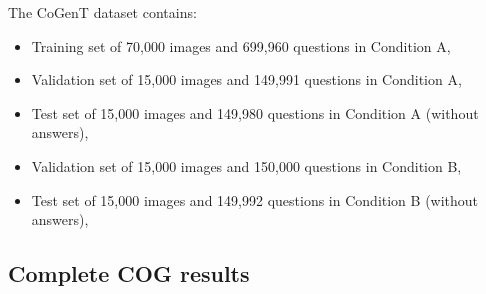 The CoGenT dataset contains:
\begin{itemize}
	\item Training set of 70,000 images and 699,960 questions in Condition A,
	\item	Validation set of 15,000 images and 149,991 questions in Condition A,
	\item	Test set of 15,000 images and 149,980 questions in Condition A (without answers),
	\item	Validation set of 15,000 images and 150,000 questions in Condition B,
	\item	Test set of 15,000 images and 149,992 questions in Condition B (without answers),
\end{itemize}

\subsection{Complete COG results}
\label{sec:cog-all-results}

